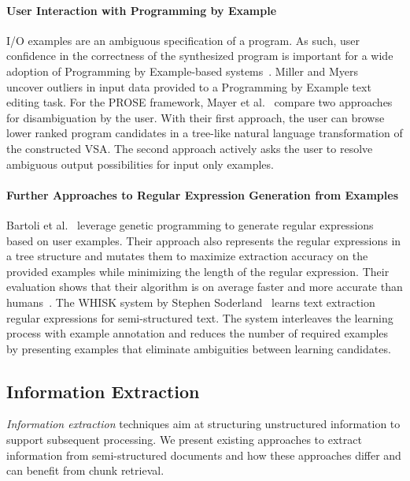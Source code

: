 \documentclass[\myrootdir/main.tex]{subfiles}
\begin{document}
\paragraph{User Interaction with Programming by Example}
I/O examples are an ambiguous specification of a program.
As such, user confidence in the correctness of the synthesized program is important for a wide adoption of Programming by Example-based systems~\cite{lau2009why-programming-by-demonstration}.
Miller and Myers~\cite{miller2001outlier} uncover outliers in input data provided to a Programming by Example text editing task.
For the PROSE framework, Mayer et al.~\cite{mayer2015user} compare two approaches for disambiguation by the user.
With their first approach, the user can browse lower ranked program candidates in a tree-like natural language transformation of the constructed VSA\@.
The second approach actively asks the user to resolve ambiguous output possibilities for input only examples.


\paragraph{Further Approaches to Regular Expression Generation from Examples}
Bartoli et al.~\cite{bartoli2012automatic} leverage genetic programming to generate regular expressions based on user examples.
Their approach also represents the regular expressions in a tree structure and mutates them to maximize extraction accuracy on the provided examples while minimizing the length of the regular expression.
Their evaluation shows that their algorithm is on average faster and more accurate than humans~\cite{bartoli2016on-the-automatic}.
The WHISK system by Stephen Soderland~\cite{soderland1999learning} learns text extraction regular expressions for semi-structured text.
The system interleaves the learning process with example annotation and reduces the number of required examples by presenting examples that eliminate ambiguities between learning candidates.

\subsection{Information Extraction} %
\emph{Information extraction} techniques aim at structuring unstructured information to support subsequent processing.
We present existing approaches to extract information from semi-structured documents and how these approaches differ and can benefit from chunk retrieval.
\end{document}

